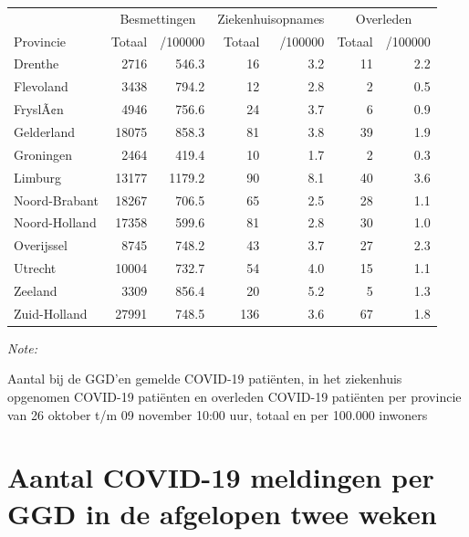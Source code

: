 \documentclass[
  english,
  man,floatsintext]{apa6}
\begin{document}
\begin{table}
\centering
\begin{threeparttable}
\begin{tabular}{lrrrrrr}
\toprule
\multicolumn{1}{c}{ } & \multicolumn{2}{c}{Besmettingen} & \multicolumn{2}{c}{Ziekenhuisopnames} & \multicolumn{2}{c}{Overleden} \\
\cmidrule(l{3pt}r{3pt}){2-3} \cmidrule(l{3pt}r{3pt}){4-5} \cmidrule(l{3pt}r{3pt}){6-7}
Provincie & Totaal & /100000 & Totaal & /100000 & Totaal & /100000\\
\midrule
Drenthe & 2716 & 546.3 & 16 & 3.2 & 11 & 2.2\\
Flevoland & 3438 & 794.2 & 12 & 2.8 & 2 & 0.5\\
FryslÃ¢n & 4946 & 756.6 & 24 & 3.7 & 6 & 0.9\\
Gelderland & 18075 & 858.3 & 81 & 3.8 & 39 & 1.9\\
Groningen & 2464 & 419.4 & 10 & 1.7 & 2 & 0.3\\
Limburg & 13177 & 1179.2 & 90 & 8.1 & 40 & 3.6\\
Noord-Brabant & 18267 & 706.5 & 65 & 2.5 & 28 & 1.1\\
Noord-Holland & 17358 & 599.6 & 81 & 2.8 & 30 & 1.0\\
Overijssel & 8745 & 748.2 & 43 & 3.7 & 27 & 2.3\\
Utrecht & 10004 & 732.7 & 54 & 4.0 & 15 & 1.1\\
Zeeland & 3309 & 856.4 & 20 & 5.2 & 5 & 1.3\\
Zuid-Holland & 27991 & 748.5 & 136 & 3.6 & 67 & 1.8\\
\bottomrule
\end{tabular}
\begin{tablenotes}
\item \textit{Note: } 
\item Aantal bij de GGD’en gemelde COVID-19 patiënten, in het ziekenhuis opgenomen COVID-19 patiënten en overleden COVID-19 patiënten per provincie van 26 oktober t/m 09 november 10:00 uur, totaal en per 100.000 inwoners
\end{tablenotes}
\end{threeparttable}
\end{table}

\newpage

\hypertarget{aantal-covid-19-meldingen-per-ggd-in-de-afgelopen-twee-weken}{%
\section{Aantal COVID-19 meldingen per GGD in de afgelopen twee weken}\label{aantal-covid-19-meldingen-per-ggd-in-de-afgelopen-twee-weken}}
\end{document}
